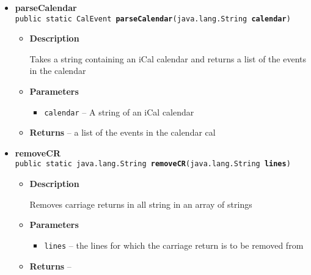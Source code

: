 \documentclass[11pt,a4paper]{report}
\begin{document}
{{{\begin{itemize}
{\begin{itemize}
{Takes an string array containing an iCal event, and returns the value of the type
}
\item{
{\bf  Parameters}
  \begin{itemize}
   \item{
\texttt{event} -- the event to be parsed}
   \item{
\texttt{type} -- the type of the value to be fished out}
  \end{itemize}
}%
\item{{\bf  Returns} -- 
the value of the type type in the event 
}%
\end{itemize}
}%
\item{ 
{\bf  parseCalendar}\\
\texttt{public static CalEvent\lbrack \rbrack \ {\bf  parseCalendar}(\texttt{java.lang.String} {\bf  calendar})
\label{is.mpg.ruglan.data.iCalParser.parseCalendar(java.lang.String)}}%
\begin{itemize}
\item{
{\bf  Description}

Takes a string containing an iCal calendar and returns a list of the events in the calendar
}
\item{
{\bf  Parameters}
  \begin{itemize}
   \item{
\texttt{calendar} -- A string of an iCal calendar}
  \end{itemize}
}%
\item{{\bf  Returns} -- 
a list of the events in the calendar cal 
}%
\end{itemize}
}%
\item{ 
{\bf  removeCR}\\
\texttt{public static java.lang.String\lbrack \rbrack \ {\bf  removeCR}(\texttt{java.lang.String\lbrack \rbrack } {\bf  lines})
\label{is.mpg.ruglan.data.iCalParser.removeCR(java.lang.String[])}}%
\begin{itemize}
\item{
{\bf  Description}

Removes carriage returns in all string in an array of strings
}
\item{
{\bf  Parameters}
  \begin{itemize}
   \item{
\texttt{lines} -- the lines for which the carriage return is to be removed from}
  \end{itemize}
}%
\item{{\bf  Returns} -- 
 
}
\end{itemize}}
\end{itemize}}}}
\end{document}
